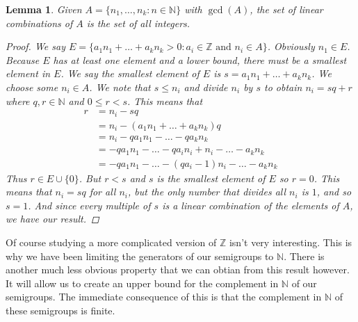 \documentclass[11pt]{amsart}
\theoremstyle{plain}
\newtheorem{lemma}{Lemma}
\theoremstyle{definition}
\begin{document}
\begin{lemma}
  Given $A=\{n_1,\dots,n_k:n\in \mathbb{N}\}$ with $\gcd(A)$, the set of linear
  combinations of $A$ is the set of all integers.
  \begin{proof}
    We say $E=\{a_1n_1+\dots+a_kn_k>0:a_i\in \mathbb{Z}\text{ and }n_i\in A\}$.
    Obviously $n_1\in E$. Because $E$ has at least one element and a lower
    bound, there must be a smallest element in $E$. We say the smallest element
    of $E$ is $s=a_1n_1+\dots+a_kn_k$. We choose some $n_i\in A$. We note that
    $s\le n_i$ and divide $n_i$ by $s$ to obtain $n_i=sq+r$ where
    $q,r\in \mathbb{N}$ and $0\le r<s$. This means that
    \begin{align*}
      r&=n_i-sq\\
      &=n_i-(a_1n_1+\dots+a_kn_k)q\\
      &=n_i-qa_1n_1-\dots-qa_kn_k\\
      &=-qa_1n_1-\dots-qa_in_i+n_i-\dots-a_kn_k\\
      &=-qa_1n_1-\dots-(qa_i-1)n_i-\dots-a_kn_k
    \end{align*}
    Thus $r\in E\cup \{0\}$. But $r<s$ and $s$ is the smallest element of $E$ so
    $r=0$. This means that $n_i=sq$ for all $n_i$, but the only number that
    divides all $n_i$ is $1$, and so $s=1$. And since every multiple of $s$ is
    a linear combination of the elements of $A$, we have our result.
  \end{proof}
\end{lemma}
Of course studying a more complicated version of $\mathbb{Z}$ isn't very
interesting. This is why we have been limiting the generators of our semigroups
to $\mathbb{N}$. There is another much less obvious property that we can obtian
from this result however. It will allow us to create an upper bound for the
complement in $\mathbb{N}$ of our semigroups. The immediate consequence of this
is that the complement in $\mathbb{N}$ of these semigroups is finite.
\end{document}

